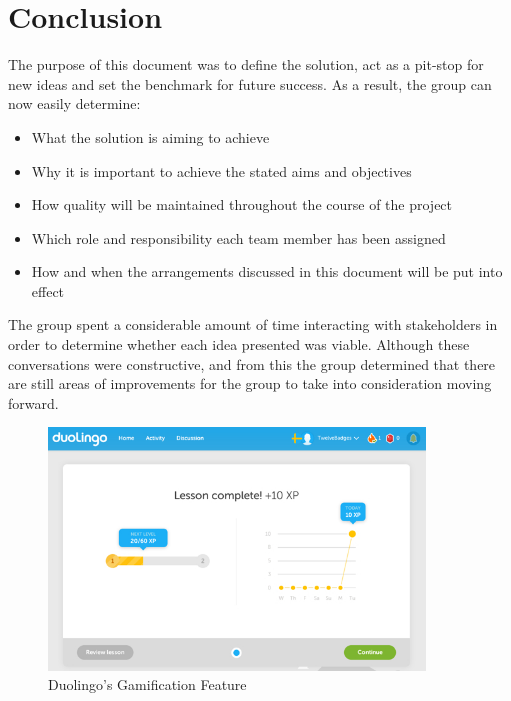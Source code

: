 \section{Conclusion}

The purpose of this document was to define the solution, act as a pit-stop for new ideas and set the benchmark for future success. As a result, the group can now easily determine:

\begin{itemize}
  \item What the solution is aiming to achieve
  \item Why it is important to achieve the stated aims and objectives
  \item How quality will be maintained throughout the course of the project
  \item Which role and responsibility each team member has been assigned
  \item How and when the arrangements discussed in this document will be put into effect
\end{itemize}

The group spent a considerable amount of time interacting with stakeholders in order to determine whether each idea presented was viable. Although these conversations were constructive, and from this the group determined that there are still areas of improvements for the group to take into consideration moving forward. 

\begin{figure}
  \centering
  \begin{minipage}{10cm}
    \centering
    \includegraphics[width=10cm]{inc/duolingo_gamification.jpg}
    \caption{Duolingo's Gamification Feature}
    \label{fig:duolingo_gamification}
  \end{minipage}
\end{figure}

